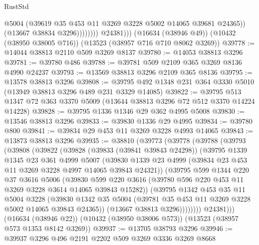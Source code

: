 \begin{lexlean}{RustStd}
\begin{coremodule}
                          @5004
                          (@39619 @35 @453 @11 @3269 @3228 @5002 @14065 @39681 @24365))
                        (@13667 @38834 @3296))))))))
          @24381)))
    (@16634 (@38946 @49))
    (@10432 (@38950 @38005 @716))
    (@13523 (@38957 @716 @710 @8062 @3269))
@39778 := @14044 @38813 @2110 @509 @3269 @8137
@39780 := @14053 @38813 @3296
@39781 := @39780 @486
@39788 := @39781 @509 @2109 @365 @3269 @8136 @4990 @24237
@39793 := @13569 @38813 @3296 @2109 @365 @8136
@39795 := @13578 @38813 @3296
@39808 := @39795 @492 @1348 @231 @364 @3330 @5010 (@13949 @38813 @3296 @489 @231 @3329 @14085)
@39822 := @39795 @513 @1347 @72 @363 @3370 @5009 (@13644 @38813 @3296 @72 @512 @3370 @14224 @14228)
@39828 := @39795 @1336 @1346 @29 @362 @4995 @5008
@39830 := @13546 @38813 @3296
@39833 := @39830 @1336 @29 @4995
@39834 := @39780 @800
@39841 := @39834 @29 @453 @11 @3269 @3228 @4993 @14065
@39843 := @13873 @38813 @3296
@39935 := @38810
    (@39773
      (@39778
        (@39788
          (@39793
            (@39808
              (@39822
                (@39828
                  (@39833 (@39841 @39843 @24298))
                  (@39795
                    @1339
                    @1345
                    @23
                    @361
                    @4999
                    @5007
                    (@39830
                      @1339
                      @23
                      @4999
                      (@39834 @23 @453 @11 @3269 @3228 @4997 @14065 @39843 @24321))
                    (@39795
                      @599
                      @1344
                      @220
                      @37
                      @3616
                      @5006
                      (@39830
                        @599
                        @220
                        @3616
                        (@39780 @596 @220 @453 @11 @3269 @3228 @3614 @14065 @39843 @15282))
                      (@39795
                        @1342
                        @453
                        @35
                        @11
                        @5004
                        @3228
                        (@39830
                          @1342
                          @35
                          @5004
                          (@39781 @35 @453 @11 @3269 @3228 @5002 @14065 @39843 @24365))
                        (@13667 @38813 @3296))))))))
          @24381)))
    (@16634 (@38946 @22))
    (@10432 (@38950 @38006 @573))
    (@13523 (@38957 @573 @1353 @8142 @3269))
@39937 := @13705 @38793 @3296
@39946 := @39937 @3296 @496 @2191 @2202 @509 @3269 @3336 @3269 @8668

\end{coremodule}
\end{lexlean}
